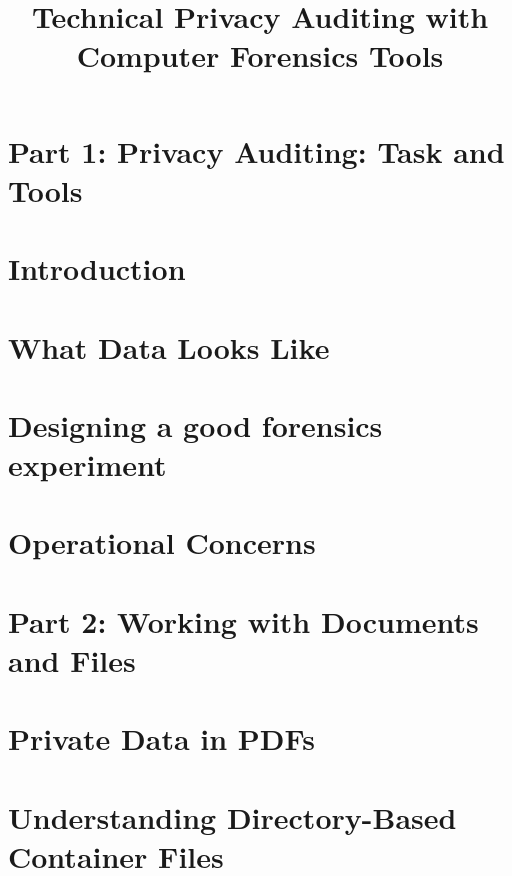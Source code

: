 \documentclass[11pt,letter]{book}
\begin{document}
\title{Technical Privacy Auditing with Computer Forensics Tools}
\chapter*{Part 1: Privacy Auditing: Task and Tools}
\chapter{Introduction}
\chapter{What Data Looks Like}
\chapter{Designing a good forensics experiment}
\chapter{Operational Concerns}
\chapter*{Part 2: Working with Documents and Files}
\chapter{Private Data in PDFs}
\chapter{Understanding Directory-Based Container Files}
\end{document}
